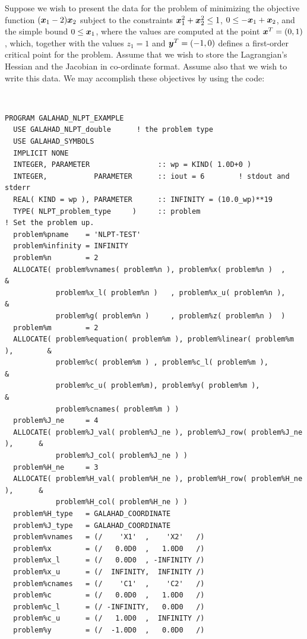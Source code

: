 \documentclass{galahad}
\begin{document}

\galexample
Suppose we wish to present the data for the problem of minimizing
the objective function
$({\bm{x}}_1 - 2 ) {\bm{x}}_2$
subject to the constraints
${\bm{x}}_1^2 +{\bm{x}}_2^2 \leq 1$,
$0 \leq -{\bm{x}}_1 + {\bm{x}}_2 $, and the simple bound
$0 \leq  {\bm{x}}_1$, where the values are computed at the point
${\bm{x}}^T = (0,1)$, which, together with the values $z_1 = 1$
and ${\bm{y}}^T = ( -1, 0 )$ defines a first-order critical point for the problem.
Assume that we wish to store the Lagrangian's Hessian and the Jacobian in
co-ordinate format. Assume also that we wish to write this data.  We may
accomplish these objectives by using the code:
{\tt \small
\begin{verbatim}
PROGRAM GALAHAD_NLPT_EXAMPLE
  USE GALAHAD_NLPT_double      ! the problem type
  USE GALAHAD_SYMBOLS
  IMPLICIT NONE
  INTEGER, PARAMETER                :: wp = KIND( 1.0D+0 )
  INTEGER,           PARAMETER      :: iout = 6        ! stdout and stderr
  REAL( KIND = wp ), PARAMETER      :: INFINITY = (10.0_wp)**19
  TYPE( NLPT_problem_type     )     :: problem 
! Set the problem up.
  problem%pname    = 'NLPT-TEST'
  problem%infinity = INFINITY
  problem%n        = 2
  ALLOCATE( problem%vnames( problem%n ), problem%x( problem%n )  ,             &
            problem%x_l( problem%n )   , problem%x_u( problem%n ),             &
            problem%g( problem%n )     , problem%z( problem%n )  )
  problem%m        = 2
  ALLOCATE( problem%equation( problem%m ), problem%linear( problem%m ),        &
            problem%c( problem%m ) , problem%c_l( problem%m ),                 &
            problem%c_u( problem%m), problem%y( problem%m ),                   &
            problem%cnames( problem%m ) ) 
  problem%J_ne     = 4
  ALLOCATE( problem%J_val( problem%J_ne ), problem%J_row( problem%J_ne ),      &
            problem%J_col( problem%J_ne ) )
  problem%H_ne     = 3
  ALLOCATE( problem%H_val( problem%H_ne ), problem%H_row( problem%H_ne ),      &
            problem%H_col( problem%H_ne ) )
  problem%H_type   = GALAHAD_COORDINATE
  problem%J_type   = GALAHAD_COORDINATE
  problem%vnames   = (/    'X1'  ,    'X2'   /)
  problem%x        = (/   0.0D0  ,   1.0D0   /)
  problem%x_l      = (/   0.0D0  , -INFINITY /)
  problem%x_u      = (/  INFINITY,  INFINITY /)
  problem%cnames   = (/    'C1'  ,    'C2'   /)
  problem%c        = (/   0.0D0  ,   1.0D0   /)
  problem%c_l      = (/ -INFINITY,   0.0D0   /)
  problem%c_u      = (/   1.0D0  ,  INFINITY /)
  problem%y        = (/  -1.0D0  ,   0.0D0   /)

\end{verbatim}}
\end{document}
